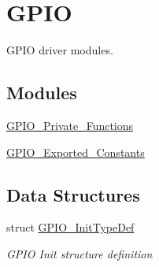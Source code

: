 \hypertarget{group___g_p_i_o}{}\section{G\+P\+IO}
\label{group___g_p_i_o}


G\+P\+IO driver modules.  


\subsection*{Modules}
\begin{DoxyCompactItemize}
\item 
\mbox{\hyperlink{group___g_p_i_o___private___functions}{G\+P\+I\+O\+\_\+\+Private\+\_\+\+Functions}}
\item 
\mbox{\hyperlink{group___g_p_i_o___exported___constants}{G\+P\+I\+O\+\_\+\+Exported\+\_\+\+Constants}}
\end{DoxyCompactItemize}
\subsection*{Data Structures}
\begin{DoxyCompactItemize}
\item 
struct \mbox{\hyperlink{struct_g_p_i_o___init_type_def}{G\+P\+I\+O\+\_\+\+Init\+Type\+Def}}
\begin{DoxyCompactList}\small\item\em G\+P\+IO Init structure definition ~\newline
 \end{DoxyCompactList}\end{DoxyCompactItemize}
